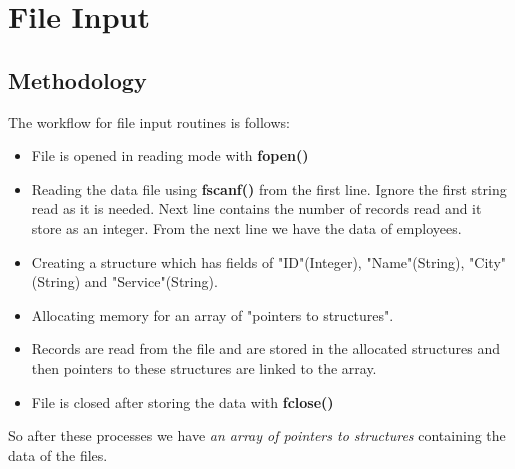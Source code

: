 
\chapter{File Input} %
\label{Chapter2}
\section{Methodology}
The workflow for file input routines is follows:
\begin{itemize}
	\item File is opened in reading mode with \textbf{fopen()}
	\item Reading the data file using \textbf{fscanf()} from the first line. Ignore the first string read as it is needed. Next line contains the number of records read and it store as an integer. From the next line we have the data of employees.
	\item Creating a structure which has fields of "ID"(Integer), "Name"(String), "City"(String) and "Service"(String).
	\item Allocating memory for an array of "pointers to structures".
	\item Records are read from the file and are stored in the allocated structures and then pointers to these structures are linked to the array.
	\item File is closed after storing the data with \textbf{fclose()}
\end{itemize}

So after these processes we have \textit{an array of pointers to structures} containing the data of the files.